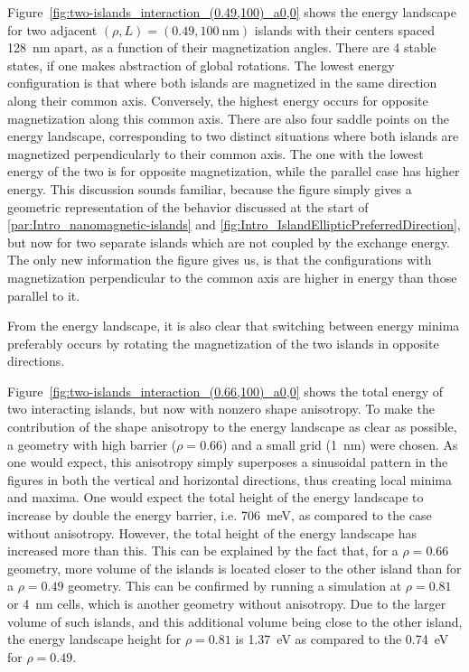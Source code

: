 \documentclass[11pt,a4paper,english]{article}
\begin{document}
Figure~\ref{fig:two-islands_interaction_(0.49,100)_a0,0} shows the energy landscape for two adjacent $(\rho, L)=(0.49, \SI{100}{\nano\metre})$ islands with their centers spaced \SI{128}{\nano\metre} apart, as a function of their magnetization angles. There are 4 stable states, if one makes abstraction of global rotations. The lowest energy configuration is that where both islands are magnetized in the same direction along their common axis. Conversely, the highest energy occurs for opposite magnetization along this common axis. There are also four saddle points on the energy landscape, corresponding to two distinct situations where both islands are magnetized perpendicularly to their common axis. The one with the lowest energy of the two is for opposite magnetization, while the parallel case has higher energy. This discussion sounds familiar, because the figure simply gives a geometric representation of the behavior discussed at the start of \cref{par:Intro_nanomagnetic-islands} and \cref{fig:Intro_IslandEllipticPreferredDirection}, but now for two separate islands which are not coupled by the exchange energy. The only new information the figure gives us, is that the configurations with magnetization perpendicular to the common axis are higher in energy than those parallel to it. \par
From the energy landscape, it is also clear that switching between energy minima preferably occurs by rotating the magnetization of the two islands in opposite directions. \par
Figure~\ref{fig:two-islands_interaction_(0.66,100)_a0,0} shows the total energy of two interacting islands, but now with nonzero shape anisotropy. To make the contribution of the shape anisotropy to the energy landscape as clear as possible, a geometry with high barrier ($\rho=0.66$) and a small grid (\SI{1}{\nano\metre}) were chosen. As one would expect, this anisotropy simply superposes a sinusoidal pattern in the figures in both the vertical and horizontal directions, thus creating local minima and maxima. One would expect the total height of the energy landscape to increase by double the energy barrier, i.e. \SI{706}{\milli\electronvolt}, as compared to the case without anisotropy. However, the total height of the energy landscape has increased more than this. This can be explained by the fact that, for a $\rho=0.66$ geometry, more volume of the islands is located closer to the other island than for a $\rho=0.49$ geometry. This can be confirmed by running a simulation at $\rho=0.81$ or \SI{4}{\nano\metre} cells, which is another geometry without anisotropy. Due to the larger volume of such islands, and this additional volume being close to the other island, the energy landscape height for $\rho=0.81$ is \SI{1.37}{\electronvolt} as compared to the \SI{0.74}{\electronvolt} for $\rho=0.49$. 
\end{document}
